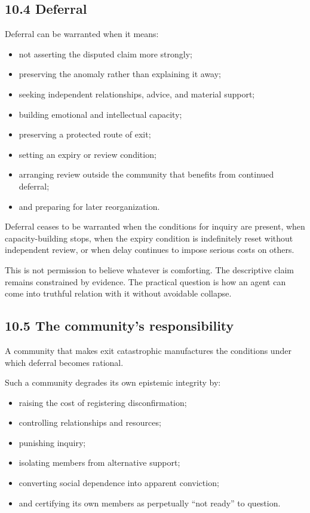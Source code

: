\documentclass[
  11pt,
]{article}
\providecommand{\tightlist}{%
  \setlength{\itemsep}{0pt}\setlength{\parskip}{0pt}}
\begin{document}
\subsection{10.4 Deferral}\label{deferral}

Deferral can be warranted when it means:

\begin{itemize}
\tightlist
\item
  not asserting the disputed claim more strongly;
\item
  preserving the anomaly rather than explaining it away;
\item
  seeking independent relationships, advice, and material support;
\item
  building emotional and intellectual capacity;
\item
  preserving a protected route of exit;
\item
  setting an expiry or review condition;
\item
  arranging review outside the community that benefits from continued
  deferral;
\item
  and preparing for later reorganization.
\end{itemize}

Deferral ceases to be warranted when the conditions for inquiry are
present, when capacity-building stops, when the expiry condition is
indefinitely reset without independent review, or when delay continues
to impose serious costs on others.

This is not permission to believe whatever is comforting. The
descriptive claim remains constrained by evidence. The practical
question is how an agent can come into truthful relation with it without
avoidable collapse.

\subsection{10.5 The community's
responsibility}\label{the-communitys-responsibility}

A community that makes exit catastrophic manufactures the conditions
under which deferral becomes rational.

Such a community degrades its own epistemic integrity by:

\begin{itemize}
\tightlist
\item
  raising the cost of registering disconfirmation;
\item
  controlling relationships and resources;
\item
  punishing inquiry;
\item
  isolating members from alternative support;
\item
  converting social dependence into apparent conviction;
\item
  and certifying its own members as perpetually ``not ready'' to
  question.
\end{itemize}
\end{document}
